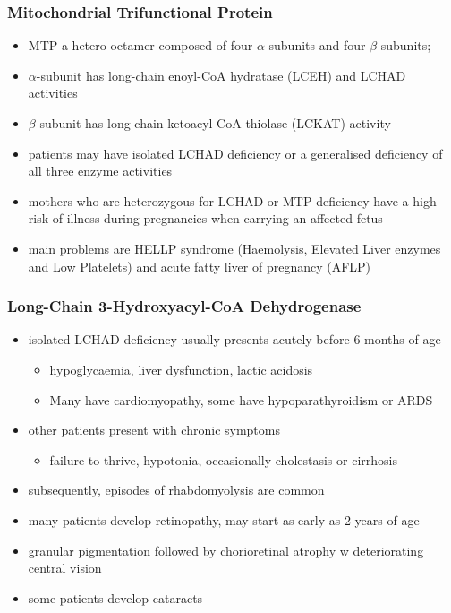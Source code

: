 \documentclass{scrartcl}
\begin{document}
\subsubsection{Mitochondrial Trifunctional Protein}
\label{sec:org6bc9ea9}
\begin{itemize}
\item MTP a hetero-octamer composed of four \(\alpha\)-subunits and four \(\beta\)-subunits;
\item \(\alpha\)-subunit has long-chain enoyl-CoA hydratase (LCEH) and LCHAD activities
\item \(\beta\)-subunit has long-chain ketoacyl-CoA thiolase (LCKAT) activity
\item patients may have isolated LCHAD deficiency or a generalised deficiency of all three enzyme activities

\item mothers who are heterozygous for LCHAD or MTP deficiency have a high
risk of illness during pregnancies when carrying an affected fetus
\item main problems are HELLP syndrome (Haemolysis, Elevated Liver
enzymes and Low Platelets) and acute fatty liver of pregnancy
(AFLP)
\end{itemize}

\subsubsection{Long-Chain 3-Hydroxyacyl-CoA Dehydrogenase}
\label{sec:orgf36459b}
\begin{itemize}
\item isolated LCHAD deficiency usually presents acutely before 6 months of age
\begin{itemize}
\item hypoglycaemia, liver dysfunction, lactic acidosis
\item Many have cardiomyopathy, some have hypoparathyroidism or ARDS
\end{itemize}
\item other patients present with chronic symptoms
\begin{itemize}
\item failure to thrive, hypotonia, occasionally cholestasis or cirrhosis
\end{itemize}
\item subsequently, episodes of rhabdomyolysis are common
\item many patients develop retinopathy, may start as early as 2 years of age
\item granular pigmentation followed by chorioretinal atrophy w deteriorating central vision
\item some patients develop cataracts
\end{itemize}
\end{document}
